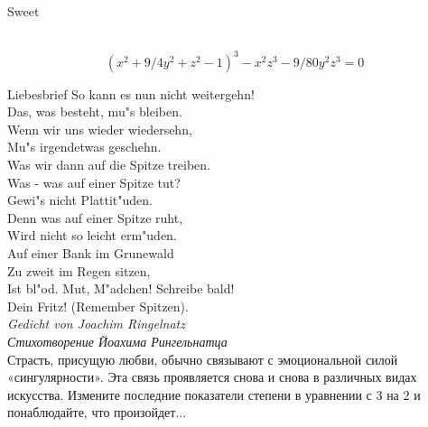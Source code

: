 \documentclass[ru]{./../../common/SurferDesc}%
\begin{document}
\footnotesize


\begin{surferPage}
  \begin{surferTitle}Sweet\end{surferTitle}   \\

\smallskip
\[(x^2+ 9/4y^2	+ z^2- 1)^3- x^2z^3	- 9/80y^2z^3	= 0\]

\singlespacing
Liebesbrief
\singlespacing
So kann es nun nicht weitergehn! \\
Das, was besteht, mu"s bleiben. \\
Wenn wir uns wieder wiedersehn, \\
Mu"s irgendetwas geschehn. \\
Was wir dann auf die Spitze treiben.\\ 
Was - was auf einer Spitze tut? \\
Gewi"s nicht Plattit"uden. \\
Denn was auf einer Spitze ruht, \\
Wird nicht so leicht erm"uden. \\
Auf einer Bank im Grunewald \\
Zu zweit im Regen sitzen, \\
Ist bl"od. Mut, M"adchen! Schreibe bald! \\
Dein Fritz! (Remember Spitzen). \\
 {\it Gedicht von Joachim Ringelnatz}\\
 {\it Стихотворение Йоахима Рингельнатца}\\
\singlespacing 
Страсть, присущую любви, обычно связывают с эмоциональной силой «сингулярности». Эта связь проявляется снова и снова в различных видах искусства.
\singlespacing 
Измените последние показатели степени в уравнении с $3$ на $2$ и понаблюдайте, что произойдет...

  \begin{surferText}
     \end{surferText}
\end{surferPage}
\end{document}

